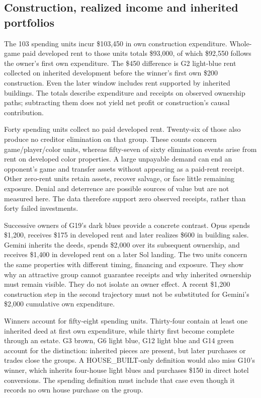 \subsection{Construction, realized income and inherited portfolios}

The 103 spending units incur \$103,450 in own construction expenditure. Whole-game paid developed rent to those units totals \$93,000, of which \$92,550 follows the owner's first own expenditure. The \$450 difference is G2 light-blue rent collected on inherited development before the winner's first own \$200 construction. Even the later window includes rent supported by inherited buildings. The totals describe expenditure and receipts on observed ownership paths; subtracting them does not yield net profit or construction's causal contribution.

Forty spending units collect no paid developed rent. Twenty-six of those also produce no creditor elimination on that group. These counts concern game/player/color units, whereas fifty-seven of sixty elimination events arise from rent on developed color properties. A large unpayable demand can end an opponent's game and transfer assets without appearing as a paid-rent receipt. Other zero-rent units retain assets, recover salvage, or face little remaining exposure. Denial and deterrence are possible sources of value but are not measured here. The data therefore support zero observed receipts, rather than forty failed investments.

Successive owners of G19's dark blues provide a concrete contrast. Opus spends \$1,200, receives \$175 in developed rent and later realizes \$600 in building sales. Gemini inherits the deeds, spends \$2,000 over its subsequent ownership, and receives \$1,400 in developed rent on a later Sol landing. The two units concern the same properties with different timing, financing and exposure. They show why an attractive group cannot guarantee receipts and why inherited ownership must remain visible. They do not isolate an owner effect. A recent \$1,200 construction step in the second trajectory must not be substituted for Gemini's \$2,000 cumulative own expenditure.

Winners account for fifty-eight spending units. Thirty-four contain at least one inherited deed at first own expenditure, while thirty first become complete through an estate. G3 brown, G6 light blue, G12 light blue and G14 green account for the distinction: inherited pieces are present, but later purchases or trades close the groups. A HOUSE\_BUILT-only definition would also miss G10's winner, which inherits four-house light blues and purchases \$150 in direct hotel conversions. The spending definition must include that case even though it records no own house purchase on the group.

